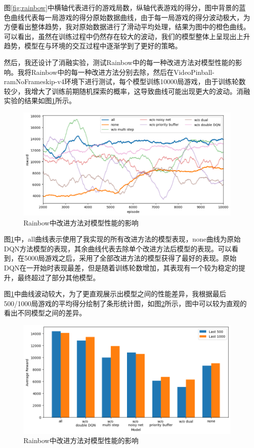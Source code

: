 \documentclass{article}
\begin{document}
图\ref{fig:rainbow}中横轴代表进行的游戏局数，纵轴代表游戏的得分，图中背景的蓝色曲线代表每一局游戏的得分原始数据曲线，由于每一局游戏的得分波动极大，为方便看出整体趋势，我对原始数据进行了滑动平均处理，结果为图中的橙色曲线。可以看出，虽然在训练过程中仍然存在较大的波动，我们的模型整体上呈现出上升趋势，模型在与环境的交互过程中逐渐学到了更好的策略。

然后，我还设计了消融实验，测试Rainbow中的每一种改进方法对模型性能的影响。我将Rainbow中的每一种改进方法分别去除，然后在VideoPinball-ramNoFrameskip-v4环境下进行测试，每个模型训练10000局游戏，由于训练轮数较少，我增大了训练前期随机探索的概率，这导致曲线可能出现更大的波动。消融实验的结果如图\ref{fig:rainbow-ablation}所示。

\begin{figure}[htbp]
	\centering
	\includegraphics[width=0.9\linewidth]{fig-rainbow-ablation.png}
	\caption{Rainbow中改进方法对模型性能的影响}
	\label{fig:rainbow-ablation}
\end{figure}

图\ref{fig:rainbow-ablation}中，all曲线表示使用了我实现的所有改进方法的模型表现，none曲线为原始DQN方法模型的表现，其余曲线代表去除单个改进方法后模型的表现。可以看到，在5000局游戏之后，采用了全部改进方法的模型获得了最好的表现。原始DQN在一开始时表现最差，但是随着训练轮数增加，其表现有一个较为稳定的提升，最终超过了部分其他模型。

图\ref{fig:rainbow-ablation}中曲线波动较大，为了更直观展示出模型之间的性能差异，我根据最后500/1000局游戏的平均得分绘制了条形统计图，如图\ref{fig:rainbow-ablation-bar}所示，图中可以较为直观的看出不同模型之间的差异。

\begin{figure}[htbp]
	\centering
	\includegraphics[width=0.9\linewidth]{fig-rainbow-ablation-bar.png}
	\caption{Rainbow中改进方法对模型性能的影响}
	\label{fig:rainbow-ablation-bar}
\end{figure}
\end{document}
